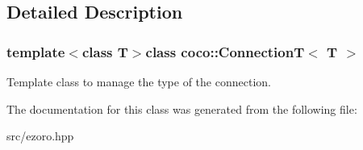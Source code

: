 \subsection{Detailed Description}
\subsubsection*{template$<$class T$>$class coco\-::\-Connection\-T$<$ T $>$}

Template class to manage the type of the connection. 

The documentation for this class was generated from the following file\-:\begin{DoxyCompactItemize}
\item 
src/ezoro.\-hpp\end{DoxyCompactItemize}
